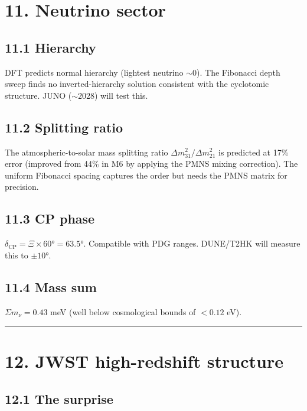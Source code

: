 \documentclass[11pt,a4paper]{article}
\begin{document}
\section*{11. Neutrino sector}

\subsection*{11.1 Hierarchy}

DFT predicts normal hierarchy (lightest neutrino $\sim 0$). The Fibonacci depth sweep finds no inverted-hierarchy solution consistent with the cyclotomic structure. JUNO ($\sim 2028$) will test this.

\subsection*{11.2 Splitting ratio}

The atmospheric-to-solar mass splitting ratio $\Delta m^2_{31} / \Delta m^2_{21}$ is predicted at 17\% error (improved from 44\% in M6 by applying the PMNS mixing correction). The uniform Fibonacci spacing captures the order but needs the PMNS matrix for precision.

\subsection*{11.3 CP phase}

$\delta_{\text{CP}} = \Xi \times 60° = 63.5°$. Compatible with PDG ranges. DUNE/T2HK will measure this to $\pm 10°$.

\subsection*{11.4 Mass sum}

$\Sigma m_{\nu} = 0.43$ meV (well below cosmological bounds of $< 0.12$ eV).

\begin{center}\rule{0.5\linewidth}{0.4pt}\end{center}

\section*{12. JWST high-redshift structure}

\subsection*{12.1 The surprise}
\end{document}
